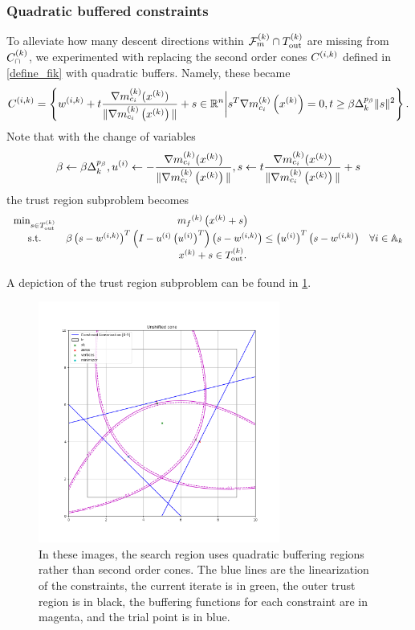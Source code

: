 \subsubsection{Quadratic buffered constraints}

\label{quadratic_buffered_description}

To alleviate how many descent directions within ${\mathcal F_m^{(k)}} \cap {T_{\text{out}}^{(k)}}$ are missing from ${C^{(k)}_{\cap}}$, 
we experimented with replacing the second order cones ${C^{(i, k)}}$ defined in \cref{define_fik} with quadratic buffers.
Namely, these became
\begin{align*}
{C^{(i, k)}} = \left\{{w^{(i, k)}} + t{\frac{\nabla m^{(k)}_{c_i}(x^{(k)})}{\|\nabla m^{(k)}_{c_i}\left(x^{(k)}\right)\|}} + s \in \mathbb R^n \bigg |  s^T{\nabla m_{c_i}^{(k)}\left(x^{(k)}\right)} = 0, t \ge \beta \Delta_k^{p_{\beta}} \|s\|^2 \right\}.
\end{align*}
Note that with the change of variables 
\begin{align*}
\beta \gets \beta \Delta_k^{p_{\beta}}, u^{(i)} \gets -{\frac{\nabla m^{(k)}_{c_i}(x^{(k)})}{\|\nabla m^{(k)}_{c_i}\left(x^{(k)}\right)\|}}, s \gets t{\frac{\nabla m^{(k)}_{c_i}(x^{(k)})}{\|\nabla m^{(k)}_{c_i}\left(x^{(k)}\right)\|}} + s
\end{align*}
the trust region subproblem becomes
\begin{align*}
\begin{array}{ccc}
\min_{s \in {T_{\text{out}}^{(k)}}} & {{m}_f}^{(k)}\left(x^{(k)} + s\right) & \\
\textrm{s.t.} & \beta \left(s-{w^{(i, k)}}\right)^T\left(I - u^{(i)}\left(u^{(i)}\right)^T\right) \left(s-{w^{(i, k)}}\right)\le \left(u^{(i)}\right)^T\left(s-{w^{(i, k)}}\right) & \forall i \in {\mathbb A_{k}} \\
& x^{(k)} + s \in {T_{\text{out}}^{(k)}}. &
\end{array}
\end{align*}


A depiction of the trust region subproblem can be found in \cref{quadratic_buffered}.

\begin{figure}[ht]
    \centering
    \includegraphics[width=300px]{images/quadratic_buffered.png}
    \caption[The quadratic buffered region.]
	{
		In these images, the search region uses quadratic buffering regions rather than second order cones.
		The blue lines are the linearization of the constraints,
		the current iterate is in green,
		the outer trust region is in black,
		the buffering functions for each constraint are in magenta,
		and the trial point is in blue.
    }
    \label{quadratic_buffered}
\end{figure}


